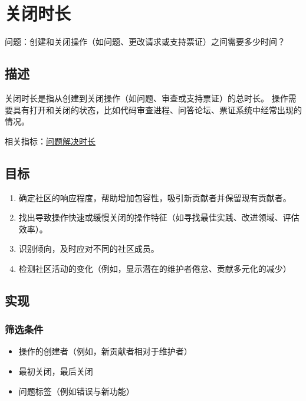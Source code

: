\hypertarget{ux5173ux95edux65f6ux957f}{%
\section{关闭时长}\label{ux5173ux95edux65f6ux957f}}

问题：创建和关闭操作（如问题、更改请求或支持票证）之间需要多少时间？

\hypertarget{ux63cfux8ff0}{%
\subsection{描述}\label{ux63cfux8ff0}}

关闭时长是指从创建到关闭操作（如问题、审查或支持票证）的总时长。
操作需要具有打开和关闭的状态，比如代码审查进程、问答论坛、票证系统中经常出现的情况。

相关指标：\href{https://chaoss.community/metric-issue-resolution-duration/}{问题解决时长}

\hypertarget{ux76eeux6807}{%
\subsection{目标}\label{ux76eeux6807}}

\begin{enumerate}
\tightlist
\item
  确定社区的响应程度，帮助增加包容性，吸引新贡献者并保留现有贡献者。
\item
  找出导致操作快速或缓慢关闭的操作特征（如寻找最佳实践、改进领域、评估效率）。
\item
  识别倾向，及时应对不同的社区成员。
\item
  检测社区活动的变化（例如，显示潜在的维护者倦怠、贡献多元化的减少）
\end{enumerate}

\hypertarget{ux5b9eux73b0}{%
\subsection{实现}\label{ux5b9eux73b0}}

\hypertarget{ux7b5bux9009ux6761ux4ef6}{%
\subsubsection{筛选条件}\label{ux7b5bux9009ux6761ux4ef6}}

\begin{itemize}
\tightlist
\item
  操作的创建者（例如，新贡献者相对于维护者）
\item
  最初关闭，最后关闭
\item
  问题标签（例如错误与新功能）
\end{itemize}

